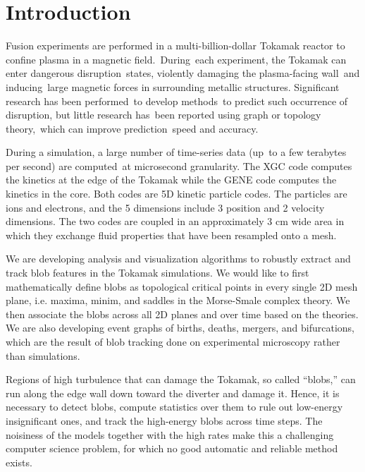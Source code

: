 \newcommand{\cA}{\mathcal{A}} %
\newcommand{\R}{\mathbb{R}} %
\newcommand{\cD}{\mathcal{D}} %
\newcommand{\cC}{\mathcal{C}} %
\newcommand{\Xs}{X^*} %
\newcommand{\cN}{\mathcal{N}} %


\section{Introduction}
\label{sec:intro}

Fusion experiments are performed in a multi-billion-dollar Tokamak reactor to confine plasma in a magnetic field. During each experiment, the Tokamak can enter dangerous disruption states, violently damaging the plasma-facing wall and inducing large magnetic forces in surrounding metallic structures. Significant research has been performed to develop methods to predict such occurrence of disruption, but little research has been reported using graph or topology theory, which can improve prediction speed and accuracy.

During a simulation, a large number of time-series data (up to a few terabytes per second) are computed at microsecond granularity. The XGC code computes the kinetics at the edge of the Tokamak while the GENE code computes the kinetics in the core. Both codes are 5D kinetic particle codes. The particles are ions and electrons, and the 5 dimensions include 3 position and 2 velocity dimensions. The two codes are coupled in an approximately 3 cm wide area in which they exchange fluid properties that have been resampled onto a mesh.

We are developing analysis and visualization algorithms to robustly extract and track blob features in the Tokamak simulations.  We would like to first mathematically define blobs as topological critical points in every single 2D mesh plane, i.e. maxima, minim, and saddles in the Morse-Smale complex theory.  We then associate the blobs across all 2D planes and over time based on the theories.  We are also developing event graphs of births, deaths, mergers, and bifurcations, which are the result of blob tracking done on experimental microscopy rather than simulations.

Regions of high turbulence that can damage the Tokamak, so called ``blobs,'' can run along the edge wall down toward the diverter and damage it.  Hence, it is necessary to detect blobs, compute statistics over them to rule out low-energy insignificant ones, and track the high-energy blobs across time steps. The noisiness of the models together with the high rates make this a challenging computer science problem, for which no good automatic and reliable method exists.

